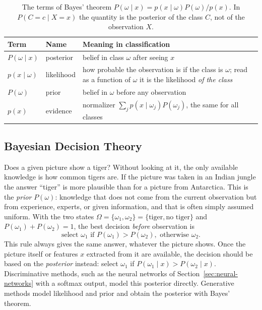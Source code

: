 \begin{table}[ht]
  \centering
  \begin{tabular}{@{}llp{7.6cm}@{}}
    \toprule
    Term & Name & Meaning in classification \\
    \midrule
    $P(\omega\mid x)$ & posterior & belief in class $\omega$ after seeing $x$ \\
    $p(x\mid\omega)$ & likelihood & how probable the observation is if the class
      is $\omega$; read as a function of $\omega$ it is the likelihood
      \emph{of the class} \\
    $P(\omega)$ & prior & belief in $\omega$ before any observation \\
    $p(x)$ & evidence & normalizer
      $\sum_j p(x\mid\omega_j)P(\omega_j)$, the same for all classes \\
    \bottomrule
  \end{tabular}
  \caption{The terms of Bayes' theorem $P(\omega\mid x) = p(x\mid\omega)P(\omega)/p(x)$.
  In $P(C=c\mid X=x)$ the quantity is the posterior of the class $C$, not of the
  observation $X$.}
  \label{tab:bayes-terms}
\end{table}

\subsection{Bayesian Decision Theory}

Does a given picture show a tiger? Without looking at it, the only available
knowledge is how common tigers are. If the picture was taken in an Indian jungle
the answer ``tiger'' is more plausible than for a picture from Antarctica. This
is the \emph{prior} $P(\omega)$: knowledge that does not come from the current
observation but from experience, experts, or given information, and that is
often simply assumed uniform. With the two states
$\Omega = \{\omega_1,\omega_2\} = \{\text{tiger},\text{no tiger}\}$ and
$P(\omega_1)+P(\omega_2) = 1$, the best decision \emph{before} observation is
\begin{equation}
  \text{select }\omega_1\text{ if } P(\omega_1) > P(\omega_2),
  \text{ otherwise }\omega_2 .
\end{equation}
\noindent
This rule always gives the same answer, whatever the picture shows. Once the
picture itself or features $x$ extracted from it are available, the decision
should be based on the \emph{posterior} instead: select $\omega_1$ if
$P(\omega_1\mid x) > P(\omega_2\mid x)$. Discriminative methods, such as the
neural networks of Section~\ref{sec:neural-networks} with a softmax output,
model this posterior directly. Generative methods model likelihood and prior and
obtain the posterior with Bayes' theorem.

